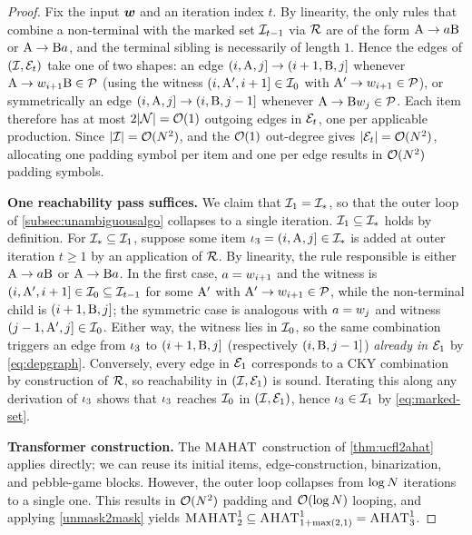 \documentclass{article}
\begin{document}
\ulcfltoahat*
\begin{proof}
    Fix the input ${{\boldsymbol{w}}}$ and an iteration index $t$.
    By linearity, the only rules that combine a non-terminal with the marked set ${{\mathcal{I}}}_{t-1}$ via ${{{ \mathcal{R}}}}$ are of the form ${{ {{ \mathrm{A}}} \rightarrow {{a}} {{ \mathrm{B}}}}}$ or ${{ {{ \mathrm{A}}} \rightarrow {{ \mathrm{B}}} {{a}}}}$, and the terminal sibling is necessarily of length $1$.
    Hence the edges of $({{\mathcal{I}}}, {\mathcal{E}}_t)$ take one of two shapes: an edge $({{ i}}, {{ \mathrm{A}}}, {{ j}}] \to ({{ i}}+1, {{ \mathrm{B}}}, {{ j}}]$ whenever ${{ {{ \mathrm{A}}} \rightarrow {w}_{{{ i}}+1} {{ \mathrm{B}}}}} \in {{ \mathcal{P}}}$ (using the witness $({{ i}}, {{ \mathrm{A}}}', {{ i}}+1] \in {{\mathcal{I}}}_0$ with ${{ {{ \mathrm{A}}}' \rightarrow {w}_{{{ i}}+1}}} \in {{ \mathcal{P}}}$), or symmetrically an edge $({{ i}}, {{ \mathrm{A}}}, {{ j}}] \to ({{ i}}, {{ \mathrm{B}}}, {{ j}}-1]$ whenever ${{ {{ \mathrm{A}}} \rightarrow {{ \mathrm{B}}} {w}_{{{ j}}}}} \in {{ \mathcal{P}}}$.
    Each item therefore has at most $2 |{{ \mathcal{N}}}| = {{ \mathcal{O}}}(1)$ outgoing edges in ${\mathcal{E}}_t$, one per applicable production.
    Since $|{{\mathcal{I}}}| = {{ \mathcal{O}}}({{ N}}^2)$, and the ${{ \mathcal{O}}}(1)$ out-degree gives $|{\mathcal{E}}_t| = {{ \mathcal{O}}}({{ N}}^2)$, allocating one padding symbol per item and one per edge results in ${{ \mathcal{O}}}({{ N}}^2)$ padding symbols.
    
    \textbf{One reachability pass suffices.}
    We claim that ${{\mathcal{I}}}_1 = {{\mathcal{I}}}_*$, so that the outer loop of \cref{subsec:unambiguousalgo} collapses to a single iteration.
    ${{\mathcal{I}}}_1 \subseteq {{\mathcal{I}}}_*$ holds by definition.
    For ${{\mathcal{I}}}_* \subseteq {{\mathcal{I}}}_1$, suppose some item ${{ \iota}}_3 = ({{ i}}, {{ \mathrm{A}}}, {{ j}}] \in {{\mathcal{I}}}_*$ is added at outer iteration $t \ge 1$ by an application of ${{{ \mathcal{R}}}}$.
    By linearity, the rule responsible is either ${{ {{ \mathrm{A}}} \rightarrow {{a}} {{ \mathrm{B}}}}}$ or ${{ {{ \mathrm{A}}} \rightarrow {{ \mathrm{B}}} {{a}}}}$.
    In the first case, ${{a}} = {w}_{{{ i}}+1}$ and the witness is $({{ i}}, {{ \mathrm{A}}}', {{ i}}+1] \in {{\mathcal{I}}}_0 \subseteq {{\mathcal{I}}}_{t-1}$ for some ${{ \mathrm{A}}}'$ with ${{ {{ \mathrm{A}}}' \rightarrow {w}_{{{ i}}+1}}} \in {{ \mathcal{P}}}$, while the non-terminal child is $({{ i}}+1, {{ \mathrm{B}}}, {{ j}}]$; the symmetric case is analogous with ${{a}} = {w}_{{{ j}}}$ and witness $({{ j}}-1, {{ \mathrm{A}}}', {{ j}}] \in {{\mathcal{I}}}_0$.
    Either way, the witness lies in ${{\mathcal{I}}}_0$, so the same combination triggers an edge from ${{ \iota}}_3$ to $({{ i}}+1, {{ \mathrm{B}}}, {{ j}}]$ (respectively $({{ i}}, {{ \mathrm{B}}}, {{ j}}-1]$) \emph{already in ${\mathcal{E}}_1$} by \cref{eq:depgraph}.
    Conversely, every edge in ${\mathcal{E}}_1$ corresponds to a CKY combination by construction of ${{{ \mathcal{R}}}}$, so reachability in $({{\mathcal{I}}}, {\mathcal{E}}_1)$ is sound.
    Iterating this along any derivation of ${{ \iota}}_3$ shows that ${{ \iota}}_3$ reaches ${{\mathcal{I}}}_0$ in $({{\mathcal{I}}}, {\mathcal{E}}_1)$, hence ${{ \iota}}_3 \in {{\mathcal{I}}}_1$ by \cref{eq:marked-set}.
    
    \textbf{Transformer construction.}
    The ${{\textsc{MAHAT}}}$ construction of \cref{thm:ucfl2ahat} applies directly; we can reuse its initial items, edge-construction, binarization, and pebble-game blocks.
    However, the outer loop collapses from $\log{{ N}}$ iterations to a single one.
    This results in  ${{ \mathcal{O}}}({{ N}}^2)$ padding and ${{ \mathcal{O}}}(\log {{ N}})$ looping, and applying \cref{unmask2mask} yields ${{\textsc{MAHAT}}}^1_2 \subseteq {{\textsc{AHAT}}}^1_{1 + \max(2,1)} = {{\textsc{AHAT}}}^1_3$.
\end{proof}
\end{document}
